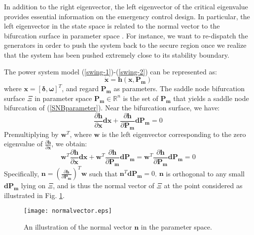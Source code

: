 \documentclass[journal]{IEEEtran}
\begin{document}
In addition to the right eigenvector, the left eigenvector of the critical eigenvalue provides essential information on the emergency control design. In particular, the left eigenvector in the state space is related to the normal vector to the bifurcation surface in parameter space \cite{Cutsem:book}\cite{Dobson:1992}\cite{Dobson:1993}. For instance, we want to re-dispatch the generators in order to push the system back to the secure region once we realize that the system has been pushed extremely close to its stability boundary.

The power system model (\ref{swing-1})-(\ref{swing-2}) can be represented as:
\begin{equation}
\bm{\dot{x}}=\bm{h}(\bm{x},\bm{P_m})\label{SNBparameter}
\end{equation}
where $\bm{x}=[\bm{\delta},\bm{\omega}]^T$, and regard $\bm{P_m}$ as parameters. The saddle node bifurcation surface $\Xi$ in parameter space $\bm{P_m}\in\mathbb{R}^n$ is the set of $\bm{P_m}$ that yields a saddle node bifurcation of (\ref{SNBparameter}). Near the bifurcation surface, we have:
\begin{equation}
\frac{\partial{\bm{h}}}{\partial{\bm{x}}}\bm{dx}+\frac{\partial{\bm{h}}}{\partial{\bm{P_m}}}\bm{dP_m}=0
\end{equation}
Premultiplying by $\bm{w}^T$, where $\bm{w}$ is the left eigenvector corresponding to the zero eigenvalue of $\frac{\partial{\bm{h}}}{\partial{\bm{x}}}$, we obtain:
\begin{equation}
\bm{w}^T\frac{\partial{\bm{h}}}{\partial{\bm{x}}}\bm{dx}+\bm{w}^T\frac{\partial{\bm{h}}}{\partial{\bm{P_m}}}\bm{dP_m}=\bm{w}^T\frac{\partial{\bm{h}}}{\partial{\bm{P_m}}}\bm{dP_m}=0
\end{equation}
Specifically, $\bm{n}=(\frac{\partial{\bm{h}}}{\partial{\bm{P_m}}})^T\bm{w}$ such that $\bm{n}^T\bm{dP_m}=0$. $\bm{n}$ is orthogonal to any small $\bm{dP_{m}}$ lying on $\Xi$, and is thus the normal vector of $\Xi$ at the point considered as illustrated in Fig. \ref{normal vector}.

\begin{figure}[!ht]
\centering
\texttt{[image: normalvector.eps]}\caption{An illustration of the normal vector $\bm{n}$ in the parameter space.}\label{normal vector}
\end{figure}
\end{document}
